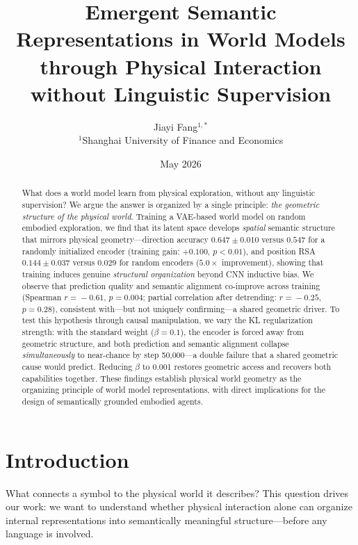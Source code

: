 \documentclass{article}
\title{Emergent Semantic Representations in World Models\\
       through Physical Interaction without Linguistic Supervision}
\author{
  Jiayi Fang$^{1,\ast}$ \\[4pt]
  $^{1}$Shanghai University of Finance and Economics
}
\date{May 2026}
\begin{document}
\maketitle

\begin{abstract}
What does a world model learn from physical exploration, without any
linguistic supervision?
We argue the answer is organized by a single principle:
\emph{the geometric structure of the physical world}.
Training a VAE-based world model on random embodied exploration,
we find that its latent space develops \emph{spatial} semantic structure
that mirrors physical geometry---direction accuracy
$0.647\!\pm\!0.010$ versus $0.547$ for a randomly initialized encoder
(training gain: $+0.100$, $p<0.01$),
and position RSA $0.144\!\pm\!0.037$ versus $0.029$ for random encoders
($5.0\times$ improvement), showing that training induces genuine
\emph{structural organization} beyond CNN inductive bias.
We observe that prediction quality and semantic alignment
co-improve across training (Spearman $r\!=\!-0.61$, $p\!=\!0.004$;
partial correlation after detrending: $r\!=\!-0.25$, $p\!=\!0.28$),
consistent with---but not uniquely confirming---a shared geometric driver.
To test this hypothesis through causal manipulation, we vary
the KL regularization strength:
with the standard weight ($\beta\!=\!0.1$), the encoder is forced
away from geometric structure, and both prediction and semantic
alignment collapse \emph{simultaneously} to near-chance by step
50{,}000---a double failure that a shared geometric cause would
predict.
Reducing $\beta$ to 0.001 restores geometric access and recovers
both capabilities together.
These findings establish physical world geometry as the organizing
principle of world model representations, with direct implications
for the design of semantically grounded embodied agents.
\end{abstract}

\section{Introduction}
\label{sec:intro}

What connects a symbol to the physical world it describes?
This question drives our work: we want to understand whether
physical interaction alone can organize internal representations
into semantically meaningful structure---before any language is involved.
\end{document}
